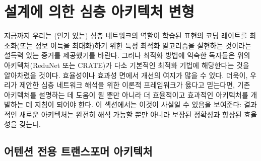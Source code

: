 \documentclass[../../book-main_ko.tex]{subfiles}
\begin{document}
\section{설계에 의한 심층 아키텍처 변형} \label{sec:chap4-derive-white-box-transformer-variants}

지금까지 우리는 (인기 있는) 심층 네트워크의 역할이 학습된 표현의 코딩 레이트를 최소화(또는 정보 이득을 최대화)하기 위한 특정 최적화 알고리즘을 실현하는 것이라는 설득력 있는 증거를 제공했기를 바란다. 그러나 최적화 방법에 익숙한 독자들은 위의 아키텍처(ReduNet 또는 CRATE)가 다소 기본적인 최적화 기법에 해당한다는 것을 알아차렸을 것이다. 효율성이나 효과성 면에서 개선의 여지가 많을 수 있다. 더욱이, 우리가 제안한 심층 네트워크 해석을 위한 이론적 프레임워크가 옳다고 믿는다면, 기존 아키텍처를 설명하는 데 도움이 될 뿐만 아니라 더 효율적이고 효과적인 아키텍처를 개발하는 데 지침이 되어야 한다. 이 섹션에서는 이것이 사실일 수 있음을 보여준다: 결과적인 새로운 아키텍처는 완전히 해석 가능할 뿐만 아니라 보장된 정확성과 향상된 효율성을 갖는다. 





\subsection{어텐션 전용 트랜스포머 아키텍처} \label{sub:aot}
\end{document}
